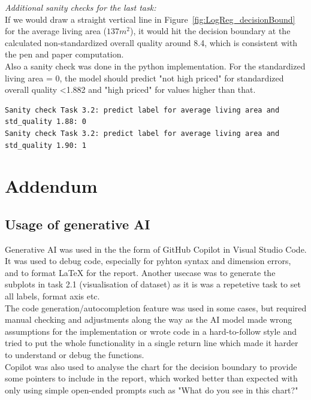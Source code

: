 \documentclass[11pt,a4paper]{article}
\begin{document}
\vspace{2em}
\noindent \textit{Additional sanity checks for the last task:}
\vspace{0.5em}
\\
If we would draw a straight vertical line in Figure~\ref{fig:LogReg_decisionBound} for the average living area ($137m^2$), it would hit the decision 
boundary at the calculated non-standardized overall quality around 8.4, which is consistent with the pen and paper computation.
\\ Also a sanity check was done in the python implementation. For the standardized living area = 0, the model should predict "not high priced" for standardized
overall quality <1.882 and "high priced" for values higher than that.
\vspace{0.5em}
\begin{lstlisting}
Sanity check Task 3.2: predict label for average living area and std_quality 1.88: 0
Sanity check Task 3.2: predict label for average living area and std_quality 1.90: 1
\end{lstlisting}

\clearpage
\section{Addendum}
\subsection{Usage of generative AI}
\noindent Generative AI was used in the the form of GitHub Copilot in Visual Studio Code. It was used to debug code, 
especially for pyhton syntax and dimension errors, and to format LaTeX for the report.
Another usecase was to generate the subplots in task 2.1 (visualisation of dataset) as it is was a repetetive task to set all labels, format axis etc.
\vspace{0.5em}
\\The code generation/autocompletion feature was used in some cases, but required manual checking and adjustments along the way 
as the AI model made wrong assumptions for the implementation or wrote code in a hard-to-follow style and tried to put the whole
functionality in a single return line which made it harder to understand or debug the functions.
\vspace{0.5em}
\\Copilot was also used to analyse the chart for the decision boundary to provide some pointers to include in the report, which worked better than 
expected with only using simple open-ended prompts such as "What do you see in this chart?"
\end{document}
